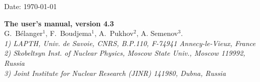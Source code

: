 \documentclass[12pt,a4paper]{article}
\begin{document}
\def\micro{{\tt micrOMEGAs}}
\def\ra{\rightarrow}
\def\calchep{{\tt CalcHEP}}

\def\suspect{{\tt SuSpect}}
\def\mbmb{m_b(m_b)}
\def\mt{m_t}
\def\dMb{\Delta m_b}
\def\dMq{\Delta m_q}
\def\delrho{\Delta\rho}
\def\bsgamma{b\to s\gamma}
\def\bsmu{B_s\to \mu^+\mu^-}
\def\gmuon{(g-2)_\mu}
\def\noi{\noindent}
\def\VERSION{4.3}
\def\neuto{\tilde\chi^0_1}
\def\neuti{\tilde\chi^0_i}
\def\neutt{\tilde\chi^0_2}
\def\neuth{\tilde\chi^0_3}
\def\smodels{{\tt SModelS}}
\def\lilith{{\tt Lilith}}
\def\HB{{\tt HiggsBounds}}
\def\HS{{\tt HiggsSignals}}

\def\eg{{\it e.g.}}
\def\ie{{\it i.e.}}

\def\br{{\rm BR}}



\def\wimpsim{{\tt WimpSim}}
\def\pppc{{\tt }PPPC4DM$\nu$}
\newcommand{\gb}{\color{blue}}

\begin{flushright}
   \vspace*{-18mm}
   Date: \today
\end{flushright}
\vspace*{2mm}




\begin{center}


{\Large\bf The   user's manual, version \VERSION} \\[8mm]

{\large   G.~B\'elanger$^1$, F.~Boudjema$^1$, A.~Pukhov$^2$,  A. Semenov$^3$.}\\[4mm]

{\it 1) LAPTH, Univ. de Savoie, CNRS, B.P.110,  F-74941 Annecy-le-Vieux, France\\
     2) Skobeltsyn Inst. of Nuclear Physics, Moscow State Univ., Moscow 119992, Russia\\
     3) Joint Institute for Nuclear Research (JINR) 141980, Dubna,  Russia\\}
\end{center}

\begin{abstract}
We give an up-to-date description of the \micro\ functions. Only the routines which are available for
the users are described.  Examples on how to use these functions
can be found in the sample main programs distributed with the code. 
\end{abstract}



\tableofcontents
\end{document}
